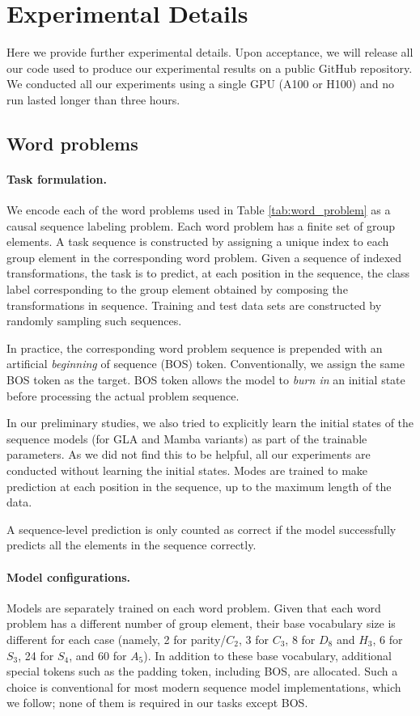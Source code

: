 \section{Experimental Details}
\label{app:exp}
Here we provide further experimental details.
Upon acceptance, we will release all our code used to produce our experimental results on a public GitHub repository.
We conducted all our experiments using a single GPU (A100 or H100) and no run lasted longer than three hours.


\subsection{Word problems}
\label{app:exp_wp}
\paragraph{Task formulation.}
We encode each of the word problems used in Table \ref{tab:word_problem} as a causal sequence labeling problem.
Each word problem has a finite set of group elements.
A task sequence is constructed by assigning a unique index to each group element in the corresponding word problem.
Given a sequence of indexed transformations, the task is to predict, at each position in the sequence, the class label corresponding to the group element obtained by composing the transformations in sequence.
Training and test data sets are constructed by randomly sampling such sequences.

In practice, the corresponding word problem sequence is prepended with an artificial
\emph{beginning} of sequence (BOS) token.
Conventionally, we assign the same BOS token as the target.
BOS token allows the model to \emph{burn in} an initial state before processing the actual problem sequence.

In our preliminary studies, we also tried to explicitly learn the initial states of the sequence models (for GLA and Mamba variants) as part of the trainable parameters.
As we did not find this to be helpful, all our experiments are conducted without learning the initial states.
Modes are trained to make prediction at each position in the sequence, up to the maximum length of the data.

A sequence-level prediction is only counted as correct if the model successfully predicts all the elements in the sequence correctly.

\paragraph{Model configurations.}
Models are separately trained on each word problem. Given that each word problem has a different number of group element, their base vocabulary size is different for each case (namely, 2 for parity/$C_2$, 3 for $C_3$, 8 for $D_8$ and $H_3$, 6 for $S_3$, 24 for $S_4$, and 60 for $A_5$).
In addition to these base vocabulary, additional special tokens such as the padding token, including BOS, are allocated.
Such a choice is conventional for most modern sequence model implementations, which we follow;
none of them is required in our tasks except BOS.

